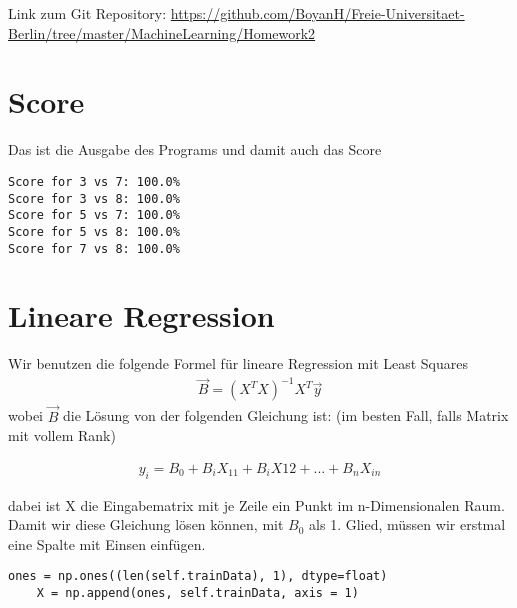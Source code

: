 \usepackage{graphicx}
\usepackage{amsmath}
\usepackage{amssymb}
\usepackage{fancyvrb}

\newcommand{\dozent}{Prof. R. Rojas}					%
\newcommand{\projectNo}{2}
\newcommand{\veranstaltung}{Mustererkennung}
\newcommand{\semester}{WS17/18}
\newcommand{\studenten}{Boyan Hristov, Nedeltscho Petrov}





Link zum Git Repository: \url{https://github.com/BoyanH/Freie-Universitaet-Berlin/tree/master/MachineLearning/Homework\projectNo}


\section*{Score}
Das ist die Ausgabe des Programs und damit auch das Score
\begin{lstlisting}
Score for 3 vs 7: 100.0%
Score for 3 vs 8: 100.0%
Score for 5 vs 7: 100.0%
Score for 5 vs 8: 100.0%
Score for 7 vs 8: 100.0%
\end{lstlisting}

\section*{Lineare Regression}

Wir benutzen die folgende Formel für lineare Regression mit Least Squares
\begin{align}
	\vec{B} = (X^TX)^{-1}X^T\vec{y}
\end{align}
wobei $\vec{B}$ die Lösung von der folgenden Gleichung ist: (im besten Fall, falls Matrix mit vollem Rank)

\begin{align}
	y_i = B_0 + B_iX_{11} + B_iX{12} + ... + B_nX_{in}
\end{align}

dabei ist X die Eingabematrix mit je Zeile ein Punkt im n-Dimensionalen Raum.
Damit wir diese Gleichung lösen können, mit $B_0$ als 1. Glied, müssen wir erstmal eine Spalte mit Einsen einfügen.

\begin{lstlisting}[style=py]
	ones = np.ones((len(self.trainData), 1), dtype=float)
	X = np.append(ones, self.trainData, axis = 1)
\end{lstlisting}

